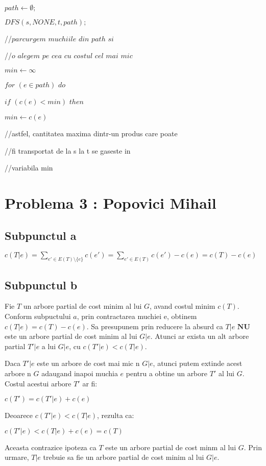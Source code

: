 \documentclass{article}
\begin{document}
{{{    \\
    \par $path \leftarrow \emptyset;$
    \par $DFS(s, NONE, t, path);$
    \\
    \par //$parcurgem$ $muchiile$ $din$ $path$ $si$ 
    \par //$o$ $alegem$ $pe$ $cea$ $cu$ $costul$ $cel$ $mai$ $mic$
    \par $min \leftarrow \infty$
    \par $for$  $(e\in path)$ $do$
    \par \hspace*{1cm} $if$ $(c(e)<min)$ $then$
    \par \hspace*{1.5cm} $min \leftarrow c(e)$
    \par //astfel, cantitatea maxima dintr-un produs care poate
    \par //fi transportat de la s la t se gaseste in 
    \par //variabila min 

}

\section*{\fontsize{20}{50}\selectfont Problema 3 : Popovici Mihail}
\subsection*{\fontsize{16}{30}\selectfont Subpunctul a}
{\fontsize{14}{16}\selectfont 

\centerline {$ c(T|e) = \sum_{ e'\in E(T)\setminus \lbrace e \rbrace } c(e') = \sum_{ e'\in E(T) } c(e') - c(e) = c(T) - c(e)$ }
}

\subsection*{\fontsize{16}{30}\selectfont Subpunctul b}
{\fontsize{14}{16}\selectfont 
    Fie $T$ un arbore partial de cost minim al lui $G$, avand costul minim $c(T)$. Conform subpuctului $a$, prin contractarea muchiei e, obtinem $c(T|e) = c(T) - c(e)$.
    Sa presupunem prin reducere la absurd ca $T|e$ $\mathbf{N} \mathbf{U}$ este un arbore partial de cost minim al lui $G|e$. Atunci ar exista un alt arbore partial $T'|e$ a lui $G|e$, cu $c(T'|e) < c(T|e)$.
    \par Daca $T'|e$ este un arbore de cost mai mic n $G|e$, atunci putem extinde acest arbore n $G$ adaugand inapoi muchia $e$ pentru a obtine un arbore $T'$ al lui $G$. Costul acestui arbore $T'$ ar fi:
    \par \centerline { $c(T') = c(T'|e) + c(e)$ }
    \par Deoarece $c(T'|e) < c(T|e)$, rezulta ca:
    \par \centerline {$c(T'|e) < c(T|e) + c(e) = c(T) $}
    \par Aceasta contrazice ipoteza ca $T$ este un arbore partial de cost minm al lui $G$. Prin urmare, $T|e$ trebuie sa fie un arbore partial de cost minim al lui $G|e$.
    }

}}
\end{document}
